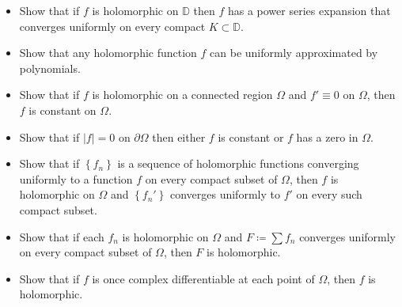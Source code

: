 \begin{itemize}
\item
  Show that if \(f\) is holomorphic on \({\mathbb{D}}\) then \(f\) has a
  power series expansion that converges uniformly on every compact
  \(K\subset {\mathbb{D}}\).
\item
  Show that any holomorphic function \(f\) can be uniformly approximated
  by polynomials.
\item
  Show that if \(f\) is holomorphic on a connected region \(\Omega\) and
  \(f'\equiv 0\) on \(\Omega\), then \(f\) is constant on \(\Omega\).
\item
  Show that if \({\left\lvert {f} \right\rvert} = 0\) on
  \({{\partial}}\Omega\) then either \(f\) is constant or \(f\) has a
  zero in \(\Omega\).
\item
  Show that if \(\left\{{f_n}\right\}\) is a sequence of holomorphic
  functions converging uniformly to a function \(f\) on every compact
  subset of \(\Omega\), then \(f\) is holomorphic on \(\Omega\) and
  \(\left\{{f_n'}\right\}\) converges uniformly to \(f'\) on every such
  compact subset.
\item
  Show that if each \(f_n\) is holomorphic on \(\Omega\) and
  \(F \coloneqq\sum f_n\) converges uniformly on every compact subset of
  \(\Omega\), then \(F\) is holomorphic.
\item
  Show that if \(f\) is once complex differentiable at each point of
  \(\Omega\), then \(f\) is holomorphic.
\end{itemize}


\printbibliography[title=Bibliography]



